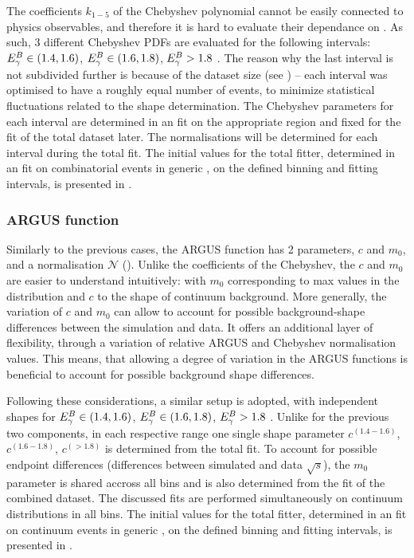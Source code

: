 The coefficients $k_{1-5}$ of the Chebyshev polynomial cannot be easily connected to physics observables,
and therefore it is hard to evaluate their dependance on \EB.
As such, 3 different Chebyshev PDFs are evaluated for the following intervals: ${E^B_{\gamma}}\in(1.4,1.6)$, ${E^B_{\gamma}}\in(1.6,1.8)$, ${E^B_{\gamma}}>1.8$ \gev.
The reason why the last interval is not subdivided further is because of the dataset size (see ) -- each interval was optimised to have a roughly equal number of events, to minimize statistical fluctuations related to the shape determination.
The Chebyshev \PDF parameters for each interval are determined in an \Mbc fit on the appropriate region and fixed for the fit of the total dataset later.
The normalisations will be determined for each \EB interval during the total fit.
The initial values for the total fitter, determined in an \Mbc fit on combinatorial \BB events in generic \MC, on the defined \EB binning and fitting intervals, is presented in .

\subsubsection{ARGUS function}\label{sec:argus_prefit}

Similarly to the previous cases, the ARGUS function has 2 parameters, $c$ and $m_0$, and a normalisation $\mathcal{N}$ ().
Unlike the coefficients of the Chebyshev, the $c$ and $m_0$ are easier to understand intuitively: with $m_0$ corresponding to max \Mbc values in the distribution and $c$ to the shape of continuum background.
More generally, the variation of $c$ and $m_0$ can allow to account for possible background-shape differences between the simulation and data.
It offers an additional layer of flexibility, through a variation of relative ARGUS and Chebyshev normalisation values.
This means, that allowing a degree of variation in the ARGUS functions is beneficial to account for possible background shape differences.

Following these considerations, a similar setup is adopted, with independent shapes for  ${E^B_{\gamma}}\in(1.4,1.6)$, ${E^B_{\gamma}}\in(1.6,1.8)$, ${E^B_{\gamma}}>1.8$ \gev.
Unlike for the previous two components, in each respective range one single shape parameter $c^{(1.4-1.6)}$, $c^{(1.6-1.8)}$, $c^{(>1.8)}$ is determined from the total fit.
To account for possible endpoint differences (differences between simulated and data $\sqrt{s}$), the $m_0$ parameter is shared accross all bins and is also determined from the fit of the combined dataset.
The discussed fits are performed simultaneously on continuum \Mbc distributions in all \EB bins.
The initial values for the total fitter, determined in an \Mbc fit on continuum events in generic \MC, on the defined \EB binning and fitting intervals, is presented in .


